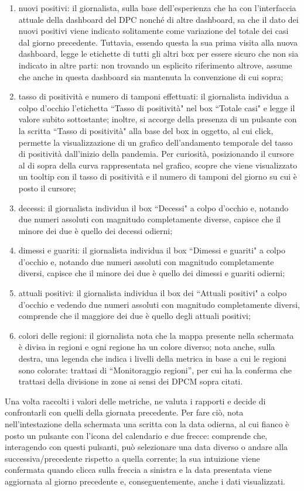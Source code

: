 \begin{enumerate}
    \item nuovi positivi: il giornalista, sulla base dell'esperienza che ha con l'interfaccia attuale della dashboard del DPC nonché di altre dashboard, sa che il dato dei nuovi positivi viene indicato solitamente come variazione del totale dei casi dal giorno precedente. Tuttavia, essendo questa la sua prima visita alla nuova dashboard, legge le etichette di tutti gli altri box per essere sicuro che non sia indicato in altre parti: non trovando un esplicito riferimento altrove, assume che anche in questa dashboard sia mantenuta la convenzione di cui sopra;
    \item tasso di positività e numero di tamponi effettuati: il giornalista individua a colpo d'occhio l'etichetta ``Tasso di positività" nel box ``Totale casi" e legge il valore subito sottostante; inoltre, si accorge della presenza di un pulsante con la scritta ``Tasso di positività" alla base del box in oggetto, al cui click, permette la visualizzazione di un grafico dell'andamento temporale del tasso di positività dall'inizio della pandemia. Per curiosità, posizionando il cursore al di sopra della curva rappresentata nel grafico, scopre che viene visualizzato un tooltip con il tasso di positività e il numero di tamponi del giorno su cui è posto il cursore;
    \item decessi: il giornalista individua il box ``Decessi" a colpo d'occhio e, notando due numeri assoluti con magnitudo completamente diverse, capisce che il minore dei due è quello dei decessi odierni;
    \item dimessi e guariti: il giornalista individua il box ``Dimessi e guariti" a colpo d'occhio e, notando due numeri assoluti con magnitudo completamente diversi, capisce che il minore dei due è quello dei dimessi e guariti odierni;
    \item attuali positivi: il giornalista individua il box dei ``Attuali positivi" a colpo d'occhio e vedendo due numeri assoluti con magnitudo completamente diversi, comprende che il maggiore dei due è quello degli attuali positivi;
    \item colori delle regioni: il giornalista nota che la mappa presente nella schermata è divisa in regioni e ogni regione ha un colore diverso; nota anche, sulla destra, una legenda che indica i livelli della metrica in base a cui le regioni sono colorate: trattasi di ``Monitoraggio regioni'', per cui ha la conferma che trattasi della divisione in zone ai sensi dei DPCM sopra citati. \label{cw1:f}
\end{enumerate}
Una volta raccolti i valori delle metriche, ne valuta i rapporti e decide di confrontarli con quelli della giornata precedente. Per fare ciò, nota nell'intestazione della schermata una scritta con la data odierna, al cui fianco è posto un pulsante con l'icona del calendario e due frecce: comprende che, interagendo con questi pulsanti, può selezionare una data diverso o andare alla successiva/precedente rispetto a quella corrente; la sua intuizione viene confermata quando clicca sulla freccia a sinistra e la data presentata viene aggiornata al giorno precedente e, conseguentemente, anche i dati visualizzati.

